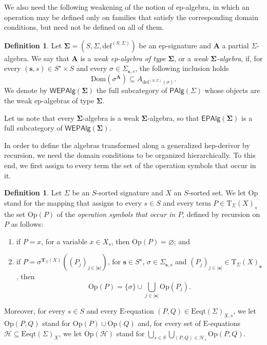 \documentclass[a4paper, reqno]{amsbook}
\newcommand{\bb}[1]{\ensuremath{\lvert #1 \rvert}}
\newcommand{\sig}[1]{\mathbf{#1}}             %
\newcommand{\Dom}{\mathrm{Dom}}
\theoremstyle{plain}
\theoremstyle{definition}
\newtheorem{definition}[theorem]{Definition}
\begin{document}
We also need the following weakening of the notion of ep-algebra, in which an operation may be defined only on families that satisfy the corresponding domain conditions, but need not be defined on all of them.

\begin{definition}\label{DWeakEpAlg}
Let $\sig{\Sigma}=(S,\Sigma,\mathrm{def}^{(S,\Sigma)})$ be an ep-signature and $\mathbf{A}$ a partial $\Sigma$-algebra.
We say that $\mathbf{A}$ is a \emph{weak ep-algebra of type $\sig{\Sigma}$}, or a \emph{weak $\sig{\Sigma}$-algebra}, if, for every $(\mathbf{s},s)\in S^{\star}\times S$ and every $\sigma\in\Sigma_{\mathbf{s},s}$, the following inclusion holds
$$
\Dom\left(\sigma^{\mathbf{A}}\right)\subseteq A_{\mathrm{def}^{(S,\Sigma)}(\sigma)}.
$$
We denote by $\mathsf{WEPAlg}(\sig{\Sigma})$ the full subcategory of $\mathsf{PAlg}(\Sigma)$ whose objects are the weak ep-algebras of type $\sig{\Sigma}$.
\end{definition}

Let us note that every $\sig{\Sigma}$-algebra is a weak $\sig{\Sigma}$-algebra, so that $\mathsf{EPAlg}(\sig{\Sigma})$ is a full subcategory of $\mathsf{WEPAlg}(\sig{\Sigma})$.

In order to define the algebras transformed along a generalized hep-derivor by recursion, we need the domain conditions to be organized hierarchically.
To this end, we first assign to every term the set of the operation symbols that occur in it.

\begin{definition}\label{DOpSymbols}
Let $\Sigma$ be an $S$-sorted signature and $X$ an $S$-sorted set.
We let $\mathrm{Op}$ stand for the mapping that assigns to every $s\in S$ and every term $P\in\mathrm{T}_{\Sigma}(X)_{s}$ the set $\mathrm{Op}(P)$ of the \emph{operation symbols that occur in $P$}, defined by recursion on $P$ as follows:
\begin{enumerate}
\item if $P=x$, for a variable $x\in X_{s}$, then $\mathrm{Op}(P)=\varnothing$; and
\item if $P=\sigma^{\mathbf{T}_{\Sigma}(X)}((P_{j})_{j\in\bb{\mathbf{s}}})$, for $\mathbf{s}\in S^{\star}$, $\sigma\in\Sigma_{\mathbf{s},s}$ and $(P_{j})_{j\in\bb{\mathbf{s}}}\in\mathrm{T}_{\Sigma}(X)_{\mathbf{s}}$, then
$$
\mathrm{Op}(P)=\{\sigma\}\cup\textstyle\bigcup_{j\in\bb{\mathbf{s}}}\mathrm{Op}(P_{j}).
$$
\end{enumerate}
Moreover, for every $s\in S$ and every $\mathrm{E}$-equation $(P,Q)\in\mathrm{Eeqt}(\Sigma)_{X,s}$, we let $\mathrm{Op}(P,Q)$ stand for $\mathrm{Op}(P)\cup\mathrm{Op}(Q)$ and, for every set of $\mathrm{E}$-equations $\mathcal{H}\subseteq\mathrm{Eeqt}(\Sigma)_{X}$, we let $\mathrm{Op}(\mathcal{H})$ stand for $\bigcup_{s\in S}\bigcup_{(P,Q)\in\mathcal{H}_{s}}\mathrm{Op}(P,Q)$.
\end{definition}
\end{document}
